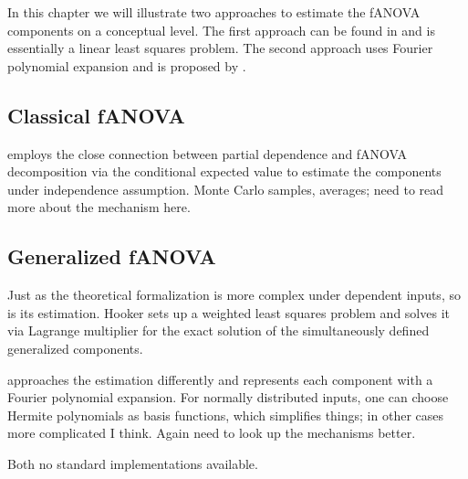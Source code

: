 In this chapter we will illustrate two approaches to estimate the fANOVA components on a conceptual level. The first approach can be found in \cite{hooker2007} and is essentially a linear least squares problem. The second approach uses Fourier polynomial expansion and is proposed by \cite{rahman2014}.

\subsection{Classical fANOVA}
\cite{hooker2004} employs the close connection between partial dependence and fANOVA decomposition via the conditional expected value to estimate the components under independence assumption.
Monte Carlo samples, averages; need to read more about the mechanism here.

\subsection{Generalized fANOVA}
Just as the theoretical formalization is more complex under dependent inputs, so is its estimation.
Hooker sets up a weighted least squares problem and solves it via Lagrange multiplier for the exact solution of the simultaneously defined generalized components. 

\cite{rahman2014} approaches the estimation differently and represents each component with a Fourier polynomial expansion. For normally distributed inputs, one can choose Hermite polynomials as basis functions, which simplifies things; in other cases more complicated I think.
Again need to look up the mechanisms better.

Both no standard implementations available. 